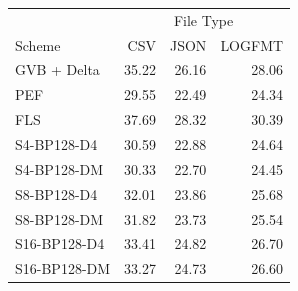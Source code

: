 \begin{tabular}{lrrr}
\toprule
 & \multicolumn{3}{c}{File Type} \\
Scheme & CSV & JSON & LOGFMT \\
\midrule
GVB + Delta & 35.22 & 26.16 & 28.06 \\
PEF & 29.55 & 22.49 & 24.34 \\
FLS & 37.69 & 28.32 & 30.39 \\
S4-BP128-D4 & 30.59 & 22.88 & 24.64 \\
S4-BP128-DM & 30.33 & 22.70 & 24.45 \\
S8-BP128-D4 & 32.01 & 23.86 & 25.68 \\
S8-BP128-DM & 31.82 & 23.73 & 25.54 \\
S16-BP128-D4 & 33.41 & 24.82 & 26.70 \\
S16-BP128-DM & 33.27 & 24.73 & 26.60 \\
\bottomrule
\end{tabular}
